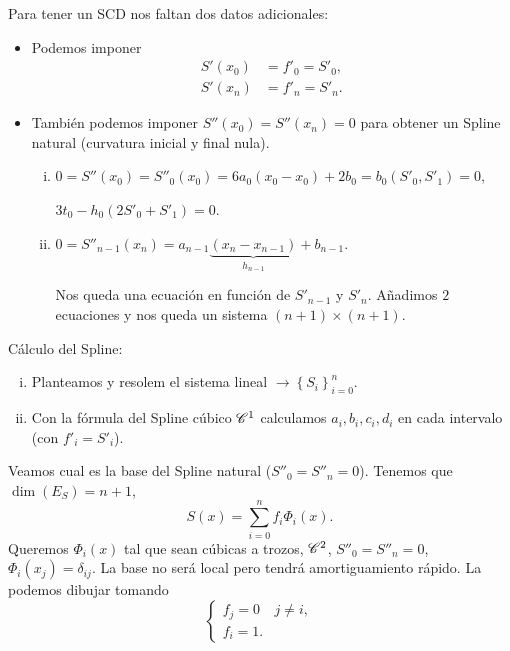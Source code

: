 Para tener un SCD nos faltan dos datos adicionales:
\begin{itemize}
    \item Podemos imponer
        \begin{align*}
            S'\left( x_0 \right) &= f'_0 = S'_0, \\
            S'\left( x_n \right) &= f'_n = S'_n.
        \end{align*}
    \item También podemos imponer $S''\left( x_0 \right) = S''\left( x_n \right) = 0$ para obtener un Spline natural (curvatura inicial y final nula).
        \begin{enumerate}[i)]
            \item $0=S''\left( x_0 \right)=S''_0\left( x_0 \right)=6a_0\left( x_0-x_0 \right)+2b_0 = b_0(S'_0, S'_1) = 0$,

                $3t_0-h_0\left( 2S'_0+S'_1 \right)=0$.
            \item $0=S''_{n-1}\left( x_n \right) = a_{n-1} \underbrace{\left( x_n-x_{n-1} \right)}_{h_{n-1}} + b_{n-1}$.

                Nos queda una ecuación en función de $S'_{n-1}$ y $S'_n$. Añadimos $2$ ecuaciones y nos queda un sistema $\left( n+1 \right)\times \left( n+1 \right)$.
        \end{enumerate}
\end{itemize}

Cálculo del Spline:
\begin{enumerate}[i)]
    \item Planteamos y resolem el sistema lineal $\rightarrow \left\{ S_i \right\}_{i=0}^n$.
    \item Con la fórmula del Spline cúbico $\mathscr{C}^1$ calculamos $a_i, b_i, c_i, d_i$ en cada intervalo (con $f'_i=S'_i$).
\end{enumerate}

Veamos cual es la base del Spline natural ($S''_0=S''_n=0$). Tenemos que $\dim\left( E_S \right)=n+1$,
\[
    S\left( x \right) = \sum_{i=0}^n f_i \Phi_i\left( x \right).
\]
Queremos $\Phi_i\left( x \right)$ tal que sean cúbicas a trozos, $\mathscr{C}^2$, $S''_0=S''_n=0$, $\Phi_i\left( x_j \right) = \delta_{ij}$. La base no será local pero tendrá amortiguamiento rápido. La podemos dibujar tomando
\[
    \begin{cases}
        f_j = 0 & j\neq i, \\
        f_i = 1.
    \end{cases}
\]

